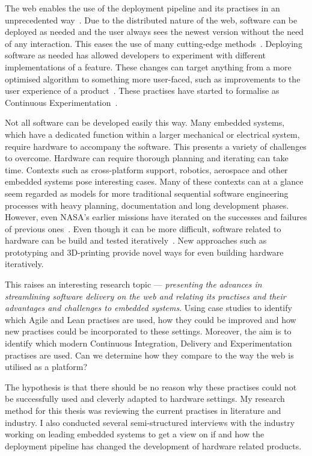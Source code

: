 \documentclass[english]{tktltiki2}
\begin{document}
The web enables the use of the deployment pipeline and its practises in an unprecedented way~\cite{KLS09}. Due to the distributed nature of the web, software can be deployed as needed and the user always sees the newest version without the need of any interaction. This eases the use of many cutting-edge methods~\cite{KLS09, FGM14}. Deploying software as needed has allowed developers to experiment with different implementations of a feature. These changes can target anything from a more optimised algorithm to something more user-faced, such as improvements to the user experience of a product~\cite{KLS09}. These practises have started to formalise as Continuous Experimentation~\cite{FGM14}.

Not all software can be developed easily this way. Many embedded systems, which have a dedicated function within a larger mechanical or electrical system, require hardware to accompany the software. This presents a variety of challenges to overcome. Hardware can require thorough planning and iterating can take time. Contexts such as cross-platform support, robotics, aerospace and other embedded systems pose interesting cases. Many of these contexts can at a glance seem regarded as models for more traditional sequential software engineering processes with heavy planning, documentation and long development phases. However, even NASA’s earlier missions have iterated on the successes and failures of previous ones~\cite{LB03}. Even though it can be more difficult, software related to hardware can be build and tested iteratively~\cite{LB03}. New approaches such as prototyping and 3D-printing provide novel ways for even building hardware iteratively.

This raises an interesting research topic — \emph{presenting the advances in streamlining software delivery on the web and relating its practises and their advantages and challenges to embedded systems}. Using case studies to identify which Agile and Lean practises are used, how they could be improved and how new practises could be incorporated to these settings. Moreover, the aim is to identify which modern Continuous Integration, Delivery and Experimentation practises are used. Can we determine how they compare to the way the web is utilised as a platform?

The hypothesis is that there should be no reason why these practises could not be successfully used and cleverly adapted to hardware settings. My research method for this thesis was reviewing the current practises in literature and industry. I also conducted several semi-structured interviews with the industry working on leading embedded systems to get a view on if and how the deployment pipeline has changed the development of hardware related products.
\end{document}
